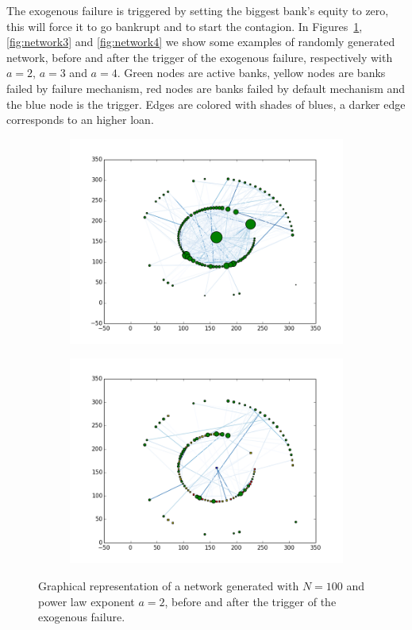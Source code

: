 \documentclass[a4paper, 11pt]{article}
\begin{document}
The exogenous failure is triggered by setting the biggest bank's equity to zero, this will force it to go bankrupt and to start the contagion. In Figures~\ref{fig:network2}, \ref{fig:network3} and \ref{fig:network4} we show some examples of randomly generated network, before and after the trigger of the exogenous failure, respectively with $a=2$, $a=3$ and $a=4$. Green nodes are active banks, yellow nodes are banks failed by failure mechanism, red nodes are banks failed by default mechanism and the blue node is the trigger. Edges are colored with shades of blues, a darker edge corresponds to an higher loan.

\begin{figure}[htbp]
    \centering
    \begin{subfigure}[b]{0.9\textwidth}
		\includegraphics[width=\textwidth]{images/network2.png}
	\end{subfigure}
    \begin{subfigure}[b]{0.9\textwidth}
		\includegraphics[width=\textwidth]{images/contagion2.png}
	\end{subfigure}
	\caption{Graphical representation of a network generated with $N = 100$ and power law exponent $a = 2$, before and after the trigger of the exogenous failure.}\label{fig:network2}
\end{figure}
\end{document}
